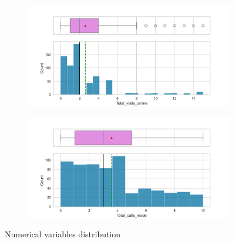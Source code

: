 \documentclass[10pt,a4paper]{style}
\begin{document}
\begin{figure}[h]
\begin{subfigure}[t]{0.49\textwidth}
			\caption{}
			\label{fig:box_Total_visits_bank}
		\end{subfigure}
		\hfill
		\begin{subfigure}[t]{0.49\textwidth}
			\includegraphics[width=\textwidth]{box_Total_visits_online.png}
			\caption{}
			\label{fig:box_Total_visits_online}
		\end{subfigure}
		\hfill
		\begin{subfigure}[t]{0.49\textwidth}
			\includegraphics[width=\textwidth]{box_Total_calls_made.png}
			\caption{}
			\label{fig:box_Total_calls_made}
		\end{subfigure}
		\caption{Numerical variables distribution}
		\label{fig:Numerical variables distribution}
		\end{figure}	
		
\end{document}
